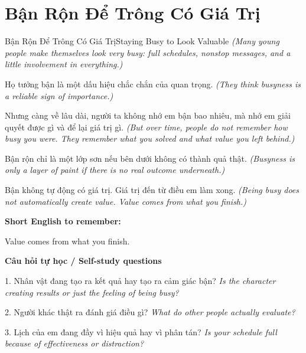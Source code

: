 \section{Bận Rộn Để Trông Có Giá Trị}
\begin{truyen}{Bận Rộn Để Trông Có Giá Trị}{Staying Busy to Look Valuable}
\textit{(Many young people make themselves look very busy: full schedules, nonstop messages, and a little involvement in everything.)}

Họ tưởng bận là một dấu hiệu chắc chắn của quan trọng.
\textit{(They think busyness is a reliable sign of importance.)}

Nhưng càng về lâu dài, người ta không nhớ em bận bao nhiêu, mà nhớ em giải quyết được gì và để lại giá trị gì.
\textit{(But over time, people do not remember how busy you were. They remember what you solved and what value you left behind.)}

Bận rộn chỉ là một lớp sơn nếu bên dưới không có thành quả thật.
\textit{(Busyness is only a layer of paint if there is no real outcome underneath.)}

\end{truyen}

\begin{baihoc}
Bận không tự động có giá trị. Giá trị đến từ điều em làm xong.
\textit{(Being busy does not automatically create value. Value comes from what you finish.)}
\end{baihoc}

\begin{ghinhoanh}
\textbf{Short English to remember:}

Value comes from what you finish.

\end{ghinhoanh}

\begin{tuhocnhanh}
\textbf{Câu hỏi tự học / Self-study questions}

1. Nhân vật đang tạo ra kết quả hay tạo ra cảm giác bận? \textit{Is the character creating results or just the feeling of being busy?}

2. Người khác thật ra đánh giá điều gì? \textit{What do other people actually evaluate?}

3. Lịch của em đang đầy vì hiệu quả hay vì phân tán? \textit{Is your schedule full because of effectiveness or distraction?}
\end{tuhocnhanh}
\ngancach

